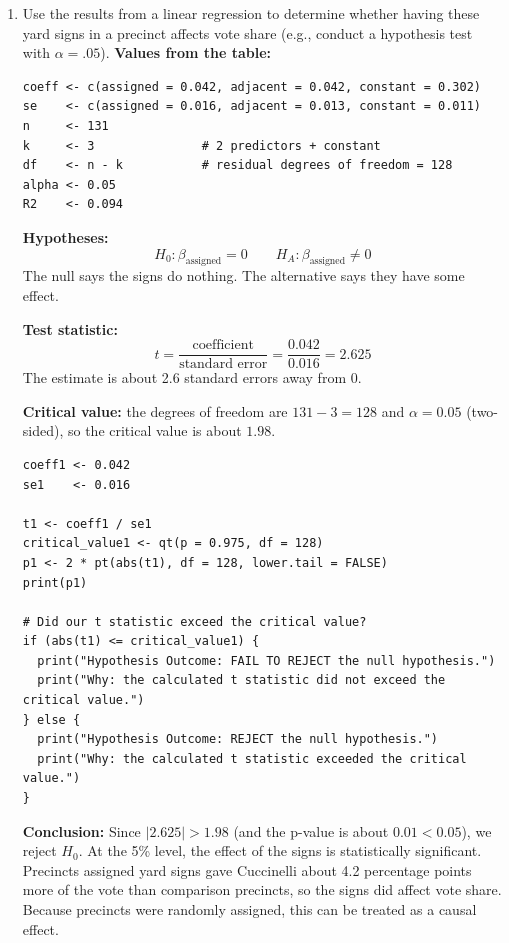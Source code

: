 \documentclass[12pt,letterpaper]{article}
\begin{document}
\vspace{.5cm}
\begin{enumerate}
	\item [(a)] Use the results from a linear regression to determine whether having these yard signs in a precinct affects vote share (e.g., conduct a hypothesis test with $\alpha = .05$).
	\vspace{.3cm}
\noindent\textbf{Values from the table:}
\begin{lstlisting}
coeff <- c(assigned = 0.042, adjacent = 0.042, constant = 0.302)
se    <- c(assigned = 0.016, adjacent = 0.013, constant = 0.011)
n     <- 131
k     <- 3               # 2 predictors + constant
df    <- n - k           # residual degrees of freedom = 128
alpha <- 0.05
R2    <- 0.094
\end{lstlisting}

\noindent\textbf{Hypotheses:}
\[
H_0: \beta_{\text{assigned}} = 0 \qquad H_A: \beta_{\text{assigned}} \neq 0
\]
The null says the signs do nothing. The alternative says they have some effect.

\noindent\textbf{Test statistic:}
\[
t = \frac{\text{coefficient}}{\text{standard error}} = \frac{0.042}{0.016} = 2.625
\]
The estimate is about 2.6 standard errors away from 0.

\noindent\textbf{Critical value:} the degrees of freedom are $131 - 3 = 128$ and $\alpha = 0.05$ (two-sided), so the critical value is about $1.98$.

\begin{lstlisting}
coeff1 <- 0.042
se1    <- 0.016

t1 <- coeff1 / se1
critical_value1 <- qt(p = 0.975, df = 128)
p1 <- 2 * pt(abs(t1), df = 128, lower.tail = FALSE)
print(p1)

# Did our t statistic exceed the critical value?
if (abs(t1) <= critical_value1) {
  print("Hypothesis Outcome: FAIL TO REJECT the null hypothesis.")
  print("Why: the calculated t statistic did not exceed the critical value.")
} else {
  print("Hypothesis Outcome: REJECT the null hypothesis.")
  print("Why: the calculated t statistic exceeded the critical value.")
}
\end{lstlisting}

\noindent\textbf{Conclusion:} Since $|2.625| > 1.98$ (and the p-value is about $0.01 < 0.05$), we reject $H_0$. At the 5\% level, the effect of the signs is statistically significant. Precincts assigned yard signs gave Cuccinelli about 4.2 percentage points more of the vote than comparison precincts, so the signs did affect vote share. Because precincts were randomly assigned, this can be treated as a causal effect.


\end{enumerate}
\end{document}
